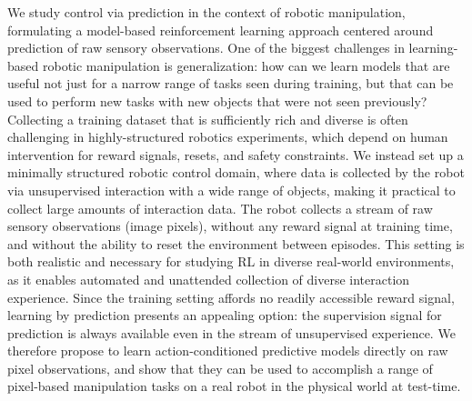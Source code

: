 We study control via prediction in the context of robotic manipulation, formulating a model-based reinforcement learning approach centered around prediction of raw sensory observations. One of the biggest challenges in learning-based robotic manipulation is generalization: how can we learn models that are useful not just for a narrow range of tasks seen during training, but that can be used to perform new tasks with new objects that were not seen previously?
Collecting a training dataset that is sufficiently rich and diverse is often challenging in highly-structured robotics experiments, which depend on human intervention for reward signals, resets, and safety constraints. We instead set up a minimally structured robotic control domain, where data is collected by the robot via unsupervised interaction with a wide range of objects, making it practical to collect large amounts of interaction data. The robot collects a stream of raw sensory observations (image pixels), without any reward signal at training time, and without the ability to reset the environment between episodes. This setting is both realistic and necessary for studying RL in diverse real-world environments, as it enables automated and unattended collection of diverse interaction experience. Since the training setting affords no readily accessible reward signal, learning by prediction presents an appealing option: the supervision signal for prediction is always available even in the stream of unsupervised experience.
We therefore propose to learn action-conditioned predictive models directly on raw pixel observations, and show that they can be used to accomplish a range of pixel-based manipulation tasks on a real robot in the physical world at test-time. 


